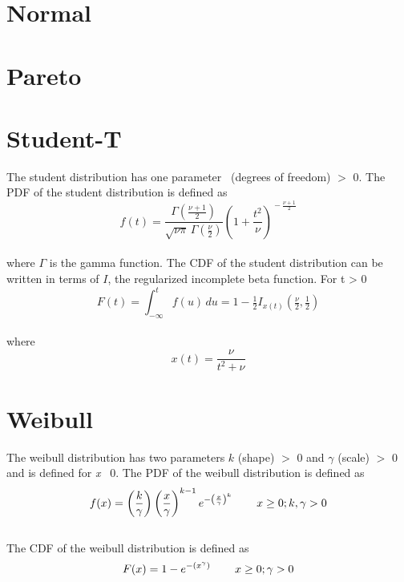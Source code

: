 	\section{Normal}

	\section{Pareto}

	\section{Student-T}
	
		The student distribution has one parameter \nu\ (degrees of freedom) $>$ 0. The \ac{PDF} of the student distribution is defined as
		\\
		$$f(t) = \frac{\Gamma(\frac{\nu+1}{2})} {\sqrt{\nu\pi}\,\Gamma(\frac{\nu}{2})} \left(1+\frac{t^2}{\nu} \right)^{\!-\frac{\nu+1}{2}}$$
		\\
		where $\Gamma$ is the gamma function. The \ac{CDF} of the student distribution can be written in terms of $I$, the regularized incomplete beta function. For t > 0
		\\
		$$F(t) = \int_{-\infty}^t f(u)\,du = 1 - \tfrac{1}{2} I_{x(t)}\left(\tfrac{\nu}{2}, \tfrac{1}{2}\right)$$
		\\
		where $$x(t) = \frac{\nu}{{t^2+\nu}}$$

	\section{Weibull}
	
		The weibull distribution has two parameters $k$ (shape) $>$ 0 and $\gamma$ (scale) $>$ 0 and is defined for \textit{x} \geq\ 0. The \ac{PDF} of the weibull distribution is defined as
		\\
		$$f(x) = \left(\frac{k}{\gamma}\right)\left(\frac{x}{\gamma}\right)^{k-1}e^{-\left(\frac{x}{\gamma}\right)^{k}} \hspace{.3in} x \geq 0; k,\gamma > 0\\$$
		\\
		The \ac{CDF} of the weibull distribution is defined as
		\\
		$$F(x) = 1 - e^{-(x^{\gamma})} \hspace{.3in} x \geq 0; \gamma > 0$$